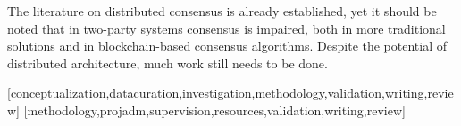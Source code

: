\documentclass[english]{textolivre}
\begin{document}
The literature on distributed consensus is already established, yet it should be noted that in two-party systems consensus is impaired, both in more traditional solutions and in blockchain-based consensus algorithms. Despite the potential of distributed architecture, much work still needs to be done.

\printbibliography\label{sec-bib}

\begin{contributors}
[conceptualization,datacuration,investigation,methodology,validation,writing,review]
[methodology,projadm,supervision,resources,validation,writing,review]
\end{contributors}
\end{document}
